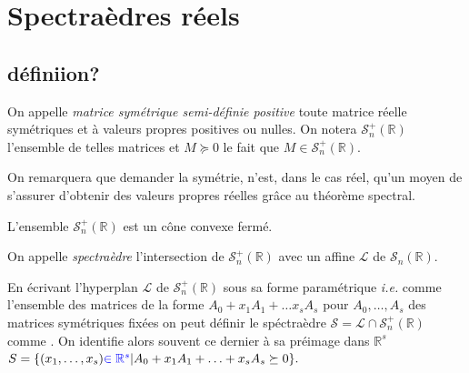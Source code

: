\section{Spectraèdres réels}

\newcommand\ssp{symétrique semi-définie positive}
\newcommand\ssps{symétriques semi-définies positives}
\newcommand\Ssp{Symétrique semi-définie positive}
\newcommand\Ssps{Symétriques semi-définies positives}

\subsection{définiion?}

\begin{definition}
	On appelle \emph{matrice symétrique semi-définie positive} toute matrice réelle symétriques et à valeurs propres positives ou nulles.
	On notera $\mathcal{S}_n^+\left(\mathbb{R}\right) $ l'ensemble de telles matrices et $M \succeq 0$ le fait que $M \in \mathcal{S}_n^+\left(\mathbb{R}\right)$.
\end{definition}

\begin{remarque}
	On remarquera que demander la symétrie, n'est, dans le cas réel, qu'un moyen de s'assurer d'obtenir des valeurs propres réelles grâce au théorème spectral.
\end{remarque}
\begin{propriete}
	L'ensemble $\mathcal{S}_n^+\left( \mathbb{R} \right) $ est un cône convexe fermé.
\end{propriete}

\begin{definition}
	On appelle \emph{spectraèdre} l'intersection de $\mathcal{S}_n^+\left(\mathbb{R}\right)$ avec un  affine $\mathcal{L}$ de $\mathcal{S}_n\left(\mathbb{R}\right)$.
\end{definition}

En écrivant l'hyperplan $\mathcal{L}$ de $\mathcal{S}_n^+\left(\mathbb{R}\right)$ sous sa forme paramétrique \textit{i.e.} comme l'ensemble des matrices de la forme $A_0 + x_1 A_1 + \ldots x_s A_s$ pour $A_0,\ldots, A_s$ des matrices symétriques fixées on peut définir le spéctraèdre $\mathcal{S} = \mathcal{L} \cap \mathcal{S}_n^+\left(\mathbb{R}\right)$ comme
. On identifie alors souvent ce dernier à sa préimage dans $\mathbb{R}^s$
$S = \{(x_1,\ldots,x_s) {\color{blue} \in \mathbb{R}^s} | A_0+ x_1A_1 + \ldots+ x_s A_s \succeq 0 \}. $


